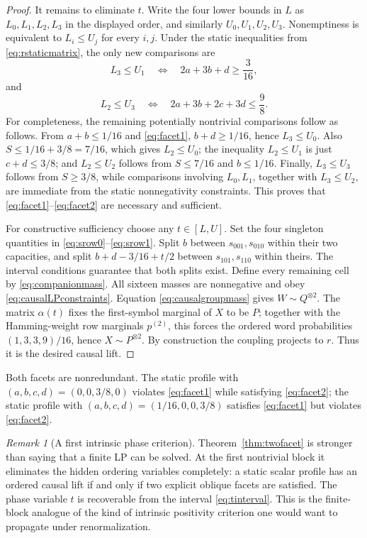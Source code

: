 \documentclass[11pt,a4paper]{article}
\theoremstyle{definition}
\theoremstyle{remark}
\newtheorem{remark}[theorem]{Remark}
\begin{document}
\begin{proof}
It remains to eliminate \(t\).  Write the four lower bounds in \(L\) as
\(L_0,L_1,L_2,L_3\) in the displayed order, and similarly
\(U_0,U_1,U_2,U_3\).  Nonemptiness is equivalent to
\(L_i\le U_j\) for every \(i,j\).  Under the static inequalities from
\eqref{eq:rstaticmatrix}, the only new comparisons are
\begin{equation}
 L_3\le U_1
 \quad\Longleftrightarrow\quad
 2a+3b+d\ge\frac3{16},
 \label{eq:compare1}
\end{equation}
and
\begin{equation}
 L_2\le U_3
 \quad\Longleftrightarrow\quad
 2a+3b+2c+3d\le\frac98.
 \label{eq:compare2}
\end{equation}
For completeness, the remaining potentially nontrivial comparisons follow as
follows.  From \(a+b\le1/16\) and \eqref{eq:facet1},
\(b+d\ge1/16\), hence \(L_3\le U_0\).  Also
\(S\le1/16+3/8=7/16\), which gives \(L_2\le U_0\); the inequality
\(L_2\le U_1\) is just \(c+d\le3/8\); and
\(L_2\le U_2\) follows from \(S\le7/16\) and \(b\le1/16\).
Finally, \(L_3\le U_3\) follows from \(S\ge3/8\), while comparisons involving
\(L_0,L_1\), together with \(L_3\le U_2\), are immediate from the static
nonnegativity constraints.  This proves that \eqref{eq:facet1}--\eqref{eq:facet2}
are necessary and sufficient.

For constructive sufficiency choose any \(t\in[L,U]\).  Set the four
singleton quantities in \eqref{eq:srow0}--\eqref{eq:srow1}.  Split \(b\)
between \(s_{001},s_{010}\) within their two capacities, and split
\(b+d-3/16+t/2\) between \(s_{101},s_{110}\) within theirs.  The interval
conditions guarantee that both splits exist.  Define every remaining cell by
\eqref{eq:companionmass}.  All sixteen masses are nonnegative and obey
\eqref{eq:causalLPconstraints}.  Equation \eqref{eq:causalgroupmass} gives
\(W\sim Q^{\otimes2}\).  The matrix \(\alpha(t)\) fixes the first-symbol
marginal of \(X\) to be \(P\); together with the Hamming-weight row
marginals \(p^{(2)}\), this forces the ordered word probabilities
\((1,3,3,9)/16\), hence \(X\sim P^{\otimes2}\).  By construction the
coupling projects to \(r\).  Thus it is the desired causal lift.
\end{proof}

Both facets are nonredundant.  The static profile with
\((a,b,c,d)=(0,0,3/8,0)\) violates \eqref{eq:facet1} while satisfying
\eqref{eq:facet2}; the static profile with
\((a,b,c,d)=(1/16,0,0,3/8)\) satisfies \eqref{eq:facet1} but violates
\eqref{eq:facet2}.

\begin{remark}[A first intrinsic phase criterion]
Theorem~\ref{thm:twofacet} is stronger than saying that a finite LP can be
solved.  At the first nontrivial block it eliminates the hidden ordering
variables completely: a static scalar profile has an ordered causal lift if
and only if two explicit oblique facets are satisfied.  The phase variable
\(t\) is recoverable from the interval \eqref{eq:tinterval}.  This is the
finite-block analogue of the kind of intrinsic positivity criterion one would
want to propagate under renormalization.
\end{remark}
\end{document}
